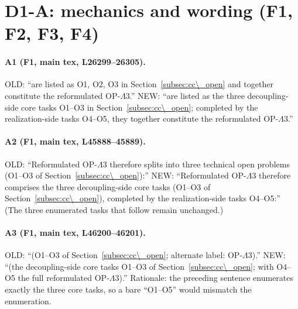 \section*{D1-A: mechanics and wording (F1, F2, F3, F4)}

\paragraph{A1 (F1, main tex, L26299--26305).}
OLD: ``are listed as O1, O2, O3 in Section~\ref{subsec:cc\_open}
and together constitute the reformulated OP-$\Lambda$3.''
NEW: ``are listed as the three decoupling-side core tasks
O1--O3 in Section~\ref{subsec:cc\_open}; completed by the
realization-side tasks O4--O5, they together constitute the
reformulated OP-$\Lambda$3.''

\paragraph{A2 (F1, main tex, L45888--45889).}
OLD: ``Reformulated OP-$\Lambda$3 therefore splits into three
technical open problems (O1--O3 of
Section~\ref{subsec:cc\_open}):''
NEW: ``Reformulated OP-$\Lambda$3 therefore comprises the three
decoupling-side core tasks (O1--O3 of
Section~\ref{subsec:cc\_open}), completed by the
realization-side tasks O4--O5:''
(The three enumerated tasks that follow remain unchanged.)

\paragraph{A3 (F1, main tex, L46200--46201).}
OLD: ``(O1--O3 of Section~\ref{subsec:cc\_open}; alternate
label: OP-$\Lambda$3).''
NEW: ``(the decoupling-side core tasks O1--O3 of
Section~\ref{subsec:cc\_open}; with O4--O5 the full reformulated
OP-$\Lambda$3).''
Rationale: the preceding sentence enumerates exactly the three
core tasks, so a bare ``O1--O5'' would mismatch the enumeration.

